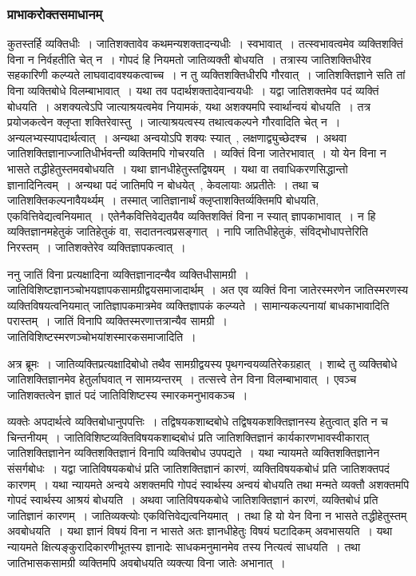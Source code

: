 			\subsubsection{प्राभाकरोक्तसमाधानम्}
				\begin{small}

					कुतस्तर्हि व्यक्तिधीः~। जातिशक्तावेव कथमन्यशक्तादन्यधीः~। स्वभावात्~। तत्स्वभावत्वमेव व्यक्तिशक्तिं विना न निर्वहतीति चेत् न~। गोपदं हि नियमतो जातिव्यक्ती बोधयति~। तत्रास्य जातिशक्तिधीरेव सहकारिणी कल्प्यते लाघवादावश्यकत्वाच्च~। न तु व्यक्तिशक्तिधीरपि गौरवात्~। जातिशक्तिज्ञाने सति तां विना व्यक्तिबोधे विलम्बाभावात्~। यथा तव पदार्थशक्तादेवान्वयधीः~। यद्वा जातिशक्तमेव पदं व्यक्तिं बोधयति~। अशक्यत्वेऽपि जात्याश्रयत्वमेव नियामकं, यथा अशक्यमपि स्वार्थान्वयं बोधयति~। तत्र प्रयोजकत्वेन क्लृप्ता शक्तिरेवास्तु~। जात्याश्रयत्वस्य तथात्वकल्पने गौरवादिति चेत् न~। अन्यलभ्यस्यापदार्थत्वात्~। अन्यथा अन्वयोऽपि शक्यः स्यात्~, लक्षणाद्व्युच्छेदश्च~। अथवा जातिशक्तिज्ञानाज्जातिधीर्भवन्ती व्यक्तिमपि गोचरयति~। व्यक्तिं विना जातेरभावात्~। यो येन विना न भासते तद्धीहेतुस्तमवबोधयति~। यथा ज्ञानधीहेतुस्तद्विषयम्~। यथा वा तवाधिकरणसिद्धान्तो ज्ञानादिनित्वम्~। अन्यथा पदं जातिमपि न बोधयेत्~, केवलायाः अप्रतीतेः~। तथा च जातिशक्तिकल्पनावैयर्थ्यम्~। तस्मात् जातिज्ञानार्थं क्लृप्ताशक्तिर्व्यक्तिमपि बोधयति, एकवित्तिवेद्यत्वनियमात्~। एतेनैकवित्तिवेद्यतयैव व्यक्तिशक्तिं विना न स्यात् ज्ञापकाभावात्~। न हि व्यक्तिज्ञानमहेतुकं जातिहेतुकं वा, सदातनत्वप्रसङ्गात्~। नापि जातिधीहेतुकं, संविद्भोधापत्तेरिति निरस्तम्~। जातिशक्तेरेव व्यक्तिज्ञापकत्वात्~। 

					ननु जातिं विना प्रत्यक्षादिना व्यक्तिज्ञानादन्यैव व्यक्तिधीसामग्री~। जातिविशिष्टज्ञानञ्चोभयज्ञापकसामग्रीद्वयसमाजादार्थम्~। अत एव व्यक्तिं विना जातेरस्मरणेन जातिस्मरणस्य व्यक्तिविषयत्वनियमात् जातिज्ञापकमात्रमेव व्यक्तिज्ञापकं कल्प्यते~। सामान्यकल्पनायां बाधकाभावादिति परास्तम्~। जातिं विनापि व्यक्तिस्मरणात्तत्रान्यैव सामग्री~। जातिविशिष्टस्मरणञ्चोभयांशस्मारकसमाजादिति~।

					अत्र ब्रूमः~। जातिव्यक्तिप्रत्यक्षादिबोधो तथैव सामग्रीद्वयस्य पृथगन्वयव्यतिरेकग्रहात्~। शाब्दे तु व्यक्तिबोधे जातिशक्तिज्ञानमेव हेतुर्लाघवात् न सामग्र्यन्तरम्~। तत्सत्त्वे तेन विना विलम्बाभावात्~। एवञ्च जातिशक्तत्वेन ज्ञातं पदं जातिविशिष्टस्य स्मारकमनुभावकञ्च~।
				\end{small}

				व्यक्तेः अपदार्थत्वे व्यक्तिबोधानुपपत्तिः~। तद्विषयकशाब्दबोधे तद्विषयकशक्तिज्ञानस्य हेतुत्वात् इति न च चिन्तनीयम्~। जातिविशिष्टव्यक्तिविषयकशाब्दबोधं प्रति जातिशक्तिज्ञानं कार्यकारणभावस्वीकारात् जातिशक्तिज्ञानेन व्यक्तिशक्तिज्ञानं विनापि व्यक्तिबोध उपपद्यते~। यथा न्यायमते व्यक्तिशक्तिज्ञानेन संसर्गबोधः~। यद्वा जातिविषयकबोधं प्रति जातिशक्तिज्ञानं कारणं, व्यक्तिविषयकबोधं प्रति जातिशक्तपदं कारणम्~। यथा न्यायमते अन्वये अशक्तमपि गोपदं स्वार्थस्य अन्वयं बोधयति तथा मन्मते व्यक्तौ अशक्तमपि गोपदं स्वार्थस्य आश्रयं बोधयति~। अथवा जातिविषयकबोधे जातिशक्तिज्ञानं कारणं, व्यक्तिबोधं प्रति जातिज्ञानं कारणम्~। जातिव्यक्त्योः एकवित्तिवेद्यत्वनियमात्~। तथा हि यो येन विना न भासते तद्धीहेतुस्तम् अवबोधयति~। यथा ज्ञानं विषयं विना न भासते अतः ज्ञानधीहेतुः विषयं घटादिकम् अवभासयति~। यथा न्यायमते क्षित्यङ्कुरादिकारणीभूतस्य ज्ञानादेः साधकमनुमानमेव तस्य नित्यत्वं साधयति~। तथा जातिभासकसामग्री व्यक्तिमपि अवबोधयति व्यक्त्या विना जातेः अभानात्~।

